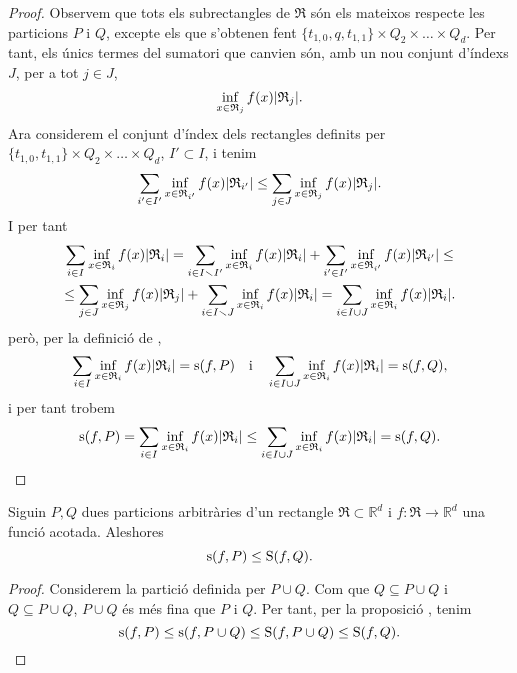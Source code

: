 \documentclass[../Apunts.tex]{subfiles}
\begin{document}
\begin{proposition}
\begin{proof}
			Observem que tots els subrectangles de \(\mathfrak{R}\) són els mateixos respecte les particions \(P\) i \(Q\), excepte els que s'obtenen fent \(\{t_{1,0},q,t_{1,1}\}\times Q_{2}\times\dots\times Q_{d}\). Per tant, els únics termes del sumatori que canvien són, amb un nou conjunt d'índexs \(J\), per a tot \(j\in J\),
			\[\inf_{x\in \mathfrak{R}_{j}}f(x)\abs{\mathfrak{R}_{j}}.\]
			Ara considerem el conjunt d'índex dels rectangles definits per \(\{t_{1,0},t_{1,1}\}\times Q_{2}\times\dots\times Q_{d}\), \(I'\subset I\), i tenim
			\[\sum_{i'\in I'}\inf_{x\in \mathfrak{R}_{i'}}f(x)\abs{\mathfrak{R}_{i'}}\leq\sum_{j\in J}\inf_{x\in \mathfrak{R}_{j}}f(x)\abs{\mathfrak{R}_{j}}.\]
			I per tant
			\begin{multline*}
			\sum_{i\in I}\inf_{x\in \mathfrak{R}_{i}}f(x)\abs{\mathfrak{R}_{i}}=
			\sum_{i\in I\smallsetminus I'}\inf_{x\in \mathfrak{R}_{i}}f(x)\abs{\mathfrak{R}_{i}}+\sum_{i'\in I'}\inf_{x\in \mathfrak{R}_{i'}}f(x)\abs{\mathfrak{R}_{i'}}\leq\\
			\leq\sum_{j\in J}\inf_{x\in \mathfrak{R}_{j}}f(x)\abs{\mathfrak{R}_{j}}+\sum_{i\in I\smallsetminus J}\inf_{x\in \mathfrak{R}_{i}}f(x)\abs{\mathfrak{R}_{i}}
			=\sum_{i\in I\cup J}\inf_{x\in \mathfrak{R}_{i}}f(x)\abs{\mathfrak{R}_{i}}.
			\end{multline*}
			però, per la definició de ,
			\[\sum_{i\in I}\inf_{x\in \mathfrak{R}_{i}}f(x)\abs{\mathfrak{R}_{i}}=\sinf(f,P)\quad\text{i}\quad\sum_{i\in I\cup J}\inf_{x\in \mathfrak{R}_{i}}f(x)\abs{\mathfrak{R}_{i}}=\sinf(f,Q),\]
			i per tant trobem
			\[\sinf(f,P)=\sum_{i\in I}\inf_{x\in \mathfrak{R}_{i}}f(x)\abs{\mathfrak{R}_{i}}\leq\sum_{i\in I\cup J}\inf_{x\in \mathfrak{R}_{i}}f(x)\abs{\mathfrak{R}_{i}}=\sinf(f,Q).\qedhere\]
		\end{proof}
	\end{proposition}
	\begin{proposition}
		\label{prop:Sumes i finor de particions}
		Siguin \(P,Q\) dues particions arbitràries d'un rectangle \(\mathfrak{R}\subset\mathbb{R}^{d}\) i \(f\colon\mathfrak{R}\to\mathbb{R}^{d}\) una funció acotada. Aleshores
		\[\operatorname{s}(f,P)\leq\operatorname{S}(f,Q).\]
		\begin{proof}
			Considerem la partició definida per \(P\cup Q\). Com que \(Q\subseteq P\cup Q\) i \(Q\subseteq P\cup Q\), \(P\cup Q\) és més fina que \(P\) i \(Q\). Per tant, per la proposició , tenim
			\[\operatorname{s}(f,P)\leq\operatorname{s}(f,P\cup Q)\leq\operatorname{S}(f,P\cup Q)\leq\operatorname{S}(f,Q).\qedhere\]
		\end{proof}
	\end{proposition}
\end{document}
